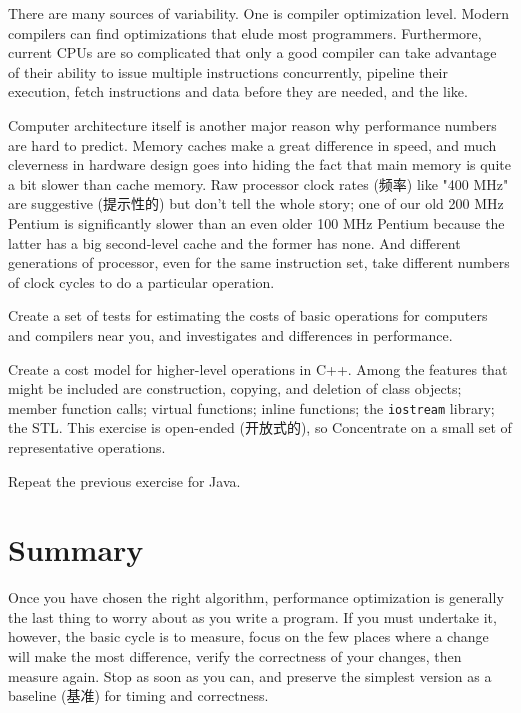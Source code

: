 There are many sources of variability. One is compiler optimization level.
Modern compilers can find optimizations that elude most programmers.
Furthermore, current CPUs are so complicated that only a good compiler can
take advantage of their ability to issue multiple instructions
concurrently, pipeline their execution, fetch instructions and data before
they are needed, and the like.

Computer architecture itself is another major reason why performance
numbers are hard to predict. Memory caches make a great difference in
speed, and much cleverness in hardware design goes into hiding the fact
that main memory is quite a bit slower than cache memory. Raw processor
clock rates (频率) like "400 MHz" are suggestive (提示性的) but don't tell
the whole story; one of our old 200 MHz Pentium is significantly slower
than an even older 100 MHz Pentium because the latter has a big
second-level cache and the former has none. And different generations of
processor, even for the same instruction set, take different numbers of
clock cycles to do a particular operation.

\begin{exercise}
    Create a set of tests for estimating the costs of basic operations for
    computers and compilers near you, and investigates and differences in
    performance.
\end{exercise}

\begin{exercise}
    \label{exer:cpp_cost_model}
    Create a cost model for higher-level operations in C++. Among the
    features that might be included are construction, copying, and deletion
    of class objects; member function calls; virtual functions; inline
    functions; the \verb'iostream' library; the STL. This exercise is
    open-ended (开放式的), so Concentrate on a small set of representative
    operations.
\end{exercise}

\begin{exercise}
    \label{exer:java_cost_model}
    Repeat the previous exercise for Java.
\end{exercise}

\section{Summary}

Once you have chosen the right algorithm, performance optimization is
generally the last thing to worry about as you write a program. If you must
undertake it, however, the basic cycle is to measure, focus on the few
places where a change will make the most difference, verify the correctness
of your changes, then measure again. Stop as soon as you can, and preserve
the simplest version as a baseline (基准) for timing and correctness.

